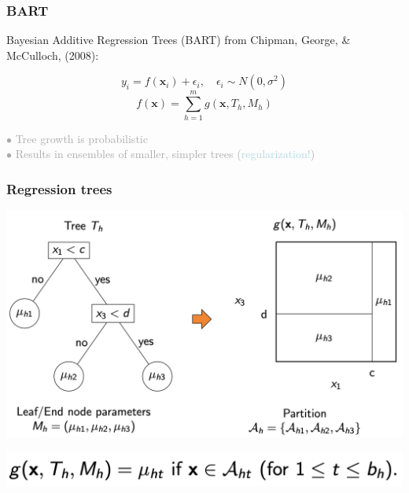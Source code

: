 \documentclass{beamer}
\newcommand{\bo}[1]{\textcolor{burntorange}{#1}}
\newcommand{\lb}[1]{\textcolor{lightblue}{#1}}
\newcommand{\dg}[1]{\textcolor{darkgray}{#1}}
\newcommand{\sk}{\vspace{.5cm}}
\begin{document}
\begin{frame}
	\frametitle{BART}
	
Bayesian Additive Regression Trees (\bo{BART}) from Chipman, George, \& McCulloch, (2008):

\sk
$$
y_i = f(\mathbf{x}_i) + \epsilon_i,\quad \epsilon_i\sim N(0, \sigma^2)
$$$$f(\mathbf{x}) = \sum_{h=1}^m g(\mathbf{x}, T_h, M_h)$$

\sk 
\dg{\small $\bullet$ Tree growth is probabilistic }\\
\dg{\small $\bullet$ Results in ensembles of smaller, simpler trees (\lb{regularization!}) }
	
\end{frame}


\begin{frame}
	\frametitle{Regression trees}
	
	\hspace*{-3mm}\includegraphics[scale=0.29]{figures/trees3} \vspace{1mm}

	\hspace*{25mm}\includegraphics[scale=0.28]{figures/trees4}
	
\end{frame}


%	
%
%	
%
%	
\end{document}
